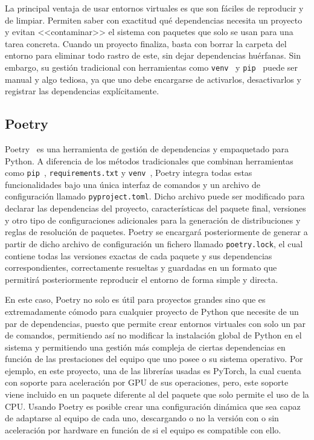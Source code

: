 La principal ventaja de usar entornos virtuales es que son fáciles de reproducir y de limpiar. Permiten saber con exactitud qué dependencias necesita un proyecto y evitan <<contaminar>> el sistema con paquetes que solo se usan para una tarea concreta. Cuando un proyecto finaliza, basta con borrar la carpeta del entorno para eliminar todo rastro de este, sin dejar dependencias huérfanas. Sin embargo, su gestión tradicional con herramientas como \texttt{venv}~\cite{pythonVenvCreation} y \texttt{pip}~\cite{pythonInstallingPackages} puede ser manual y algo tediosa, ya que uno debe encargarse de activarlos, desactivarlos y registrar las dependencias explícitamente.

\subsection{Poetry}


Poetry~\cite{pythonpoetryIntroductionDocumentation} es una herramienta de gestión de dependencias y empaquetado para Python. A diferencia de los métodos tradicionales que combinan herramientas como \texttt{pip}~\cite{pythonInstallingPackages}, \texttt{requirements.txt} y \texttt{venv}~\cite{pythonVenvCreation}, Poetry integra todas estas funcionalidades bajo una única interfaz de comandos y un archivo de configuración llamado \texttt{pyproject.toml}. Dicho archivo puede ser modificado para declarar las dependencias del proyecto, características del paquete final, versiones y otro tipo de configuraciones adicionales para la generación de distribuciones y reglas de resolución de paquetes. Poetry se encargará posteriormente de generar a partir de dicho archivo de configuración un fichero llamado \texttt{poetry.lock}, el cual contiene todas las versiones exactas de cada paquete y sus dependencias correspondientes, correctamente resueltas y guardadas en un formato que permitirá posteriormente reproducir el entorno de forma simple y directa.

En este caso, Poetry no solo es útil para proyectos grandes sino que es extremadamente cómodo para cualquier proyecto de Python que necesite de un par de dependencias, puesto que permite crear entornos virtuales con solo un par de comandos, permitiendo así no modificar la instalación global de Python en el sistema y permitiendo una gestión más compleja de ciertas dependencias en función de las prestaciones del equipo que uno posee o su sistema operativo. Por ejemplo, en este proyecto, una de las librerías usadas es PyTorch, la cual cuenta con soporte para aceleración por GPU de sus operaciones, pero, este soporte viene incluido en un paquete diferente al del paquete que solo permite el uso de la CPU. Usando Poetry es posible crear una configuración dinámica que sea capaz de adaptarse al equipo de cada uno, descargando o no la versión con o sin aceleración por hardware en función de si el equipo es compatible con ello.

